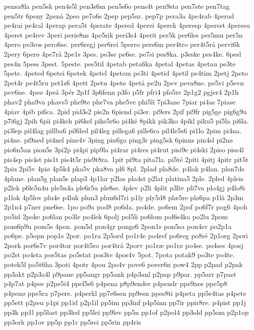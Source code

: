 {pensa8la
pen5sk
pen4s5l
pen3s6m
pen5s6o
pens4t
pen9sta
pen7ste
pen7tag
pen5tr
6peny
2penå
2peo
pe7o6s
2pep
pep5ar.
pep7p
pera3a
4pe4rab
4perad
pe4rai
pe4ral
4perap
pera5t
4perate
4pered
4perei
4perek
4peresp
4perest
4peresu
4peret
pe4rev
3peri
perie8ns
4pe5rik
peri3s4
4perit
per5k
per6les
per5mu
per5n
4pero
pe3ros
pero6se.
per6regj
per6rei
5perro
pers6m
per4tro
per4t5rå
pervi6k
2pery
6perø
4pe7rå
2pe1s
3pes.
pe3se
pe6se.
pe7si
pes8ka.
p3eske
pes4ke.
6pesl
pes4n
5pess
3pest.
5peste.
pes5til
4petab
peta6ka
4petal
4petas
4petau
pe3te
5pete.
4peted
6petei
6petek
4petel
4petem
pe3ti
4petid
4petil
pe4tim
2petj
2peto
2pet4r
pe4t5ru
pet1s6
4pett
2petu
4petø
4petå
pe2u
2pev
peva8ne.
pe5vi
p5evn
pev6ne.
4peø
4peå
3pér
2p1f
3p6fenn
p3fo
p5fr
pfri4
pfø5re
2p1g2
pgjer4
2p1h
phav2
pha9va
phavs5
phe9te
phe7va
phe5ve
phi5li
7pi3ane
7piar
pi4as
7piase
4piav
4pib
pi6ca.
2pid
pid3s2
pie2n
6piend
pi3er.
pi9ers
2pif
pi9fr
pig5ge
pig6g9u
p7i6gj
2pih
6pii
pi4keh
pi6kel
pike5r6o
pi4ké
8pikk
pik3ko
4pikl
piku5
pi5la
pi6la.
pi3lep
pil4lag
pillba6
pil6led
pil4leg
pillega6
pille6ra
pil4le5s6
pi1lo
2pim
pi4na.
pi4ne.
pi9ned
pi4nel
pine4v
3ping
pin6go
ping3r
ping5sk
6pinns
pin4sl
pi2nø
pio6n5an
pion5s
3pi2p
pi4pi
pip9la
pi4rar
pi4res
pi4rut
pisi9e
pi4ski
2piso
piss4l
pis4sp
pis4st
pis1t
pis4t5r
pis9t8ra.
1pit
pi9ta
pita7la.
pi5té
2piti
4pitj
4pitr
pit5t
2piu
2pi5v
4piø
4p5k4
pka5v
pka8va
pl6
8pl.
2plad
pla8de.
p4lak
p4lan.
plan7de
4plane.
plan5g
plan5s
plap3
4p1lar
p2las
pla4st
p2lat
platina5
2ple.
2pled
4pleis
p2lek
p6le5n4u
ple5n4a
ple6r5u
ple8se.
4plev
p2li
4plit
p3liv
pli7va
plo4gj
p4lo8i
p1lok
4p5lov
plu4e
p4luk
plun3
plun6d7ri
p1ly
ply5d8
plæ5re
plø6pa
p1lå
2p3m
2p1n4
p7ner
pne6se.
1po
po9a
pod8
po6da.
po4de.
po6em
2pof
po6f7r
pog6
4poh
po5id
2poke
po6lan
po3le
po4lek
6polj
pol5li
po6lom
pol6s4ka
po2lu
2pom
pom6p9u
pom5s
4pon.
pon5d
pon4gr
pongs6
2pon1s
pon5sa
pon4sv
po2p1a
po6pe.
p5opn
pop1s
2por.
po1ra
2p5ord
po1r4e
po4ref
po6reg
po8ré
2p1org
2pori
2pork
por6s7v
por4tor
por4t5ro
por4trå
2porv
po1ræ
po1rø
po4se.
po4ses
4posj
po2st
po4sta
pos5tas
po5stat
pos3te
4pos4v
5pot.
7pota
potak9
po3te
po4te.
potek5l
po5t6ha
3poti
4potr
4pou
2po4v
pove6
pover6n
pow4
2pp
p2pad
p2pak
pp3akt
p2p3a4l
p9pane
pp5angr
pp5ank
p4p3anl
p2pap
p9par.
pp5arr
p7past
p4p7at
p4pee
p2pe5i4
ppel5s6
p4pena
p8p9ender
p4pendr
ppe9nes
ppe5p8
p4penø
ppe5ra
p7pere.
p4perkl
pp7e6sen
pp9esn
ppes8ti
p4peta
pp5e4tas
p4pete
pp5ett
p2peu
p1pi
pp1id
p2p1il
pp5im
pp3inf
p4p5inn
pp7ir
ppir8re.
p4pist
pp1j
pp3k
pp1l
pp5last
pp3led
pp5lei
pp9lev
pp5n
pp1of
p2pol4
pp3old
pp5om
p2p1op
pp3ork
pp1ov
pp5p
pp1r
pp5rei
pp5rin
pp4ris
}
